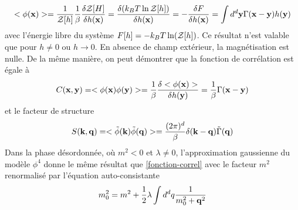 \begin{align}
    <\phi({\bf x})> = \frac{1}{\mathcal{Z}[h]} \frac{1}{\beta} \frac{\delta \mathcal{Z}[H]}{\delta h({\bf x})} = \frac{\delta (k_B T \ln \mathcal{Z}[h])}{\delta h({\bf x})} = - \frac{\delta F}{\delta h({\bf x})} = \int d^d {\bf y} \Gamma({\bf x}-{\bf y}) h({\bf y})
    \label{moyenne-phi}
\end{align} 
avec l'énergie libre du système  $F[h] = -k_B T \ln(\mathcal{Z}[h])$. Ce résultat n'est valable que pour $h \neq 0$ ou $h \to 0$. En absence de champ extérieur, la magnétisation est nulle.
De la même manière, on peut démontrer que la fonction de corrélation est égale à 
\begin{align}
    C({\bf x},{\bf y}) =  <\phi({\bf x})\phi({\bf y})> = \frac{1}{\beta} \frac{\delta <\phi({\bf x})>}{\delta h({\bf y})} = \frac{1}{\beta} \Gamma({\bf x}-{\bf y})
\end{align}
et le facteur de structure
\begin{align}
    S({\bf k},{\bf q}) = < \tilde{\phi}({\bf k})\tilde{\phi}({\bf q})> = \frac{(2 \pi)^d}{\beta} \delta({\bf k}-{\bf q})  \tilde{\Gamma}({\bf q})
\end{align}
Dans la phase désordonnée, où $m^2 \less 0$ et $\lambda \neq 0$, l'approximation gaussienne du modèle $\phi^4$ donne le même résultat que \ref{fonction-correl} avec le facteur $m^2$ renormalisé par l'équation auto-consistante \cite[\P 4.3]{bellac_equilibrium_2004}
\begin{align}
    m^2_0 = m^2 + \frac{1}{2} \lambda \int d^d q \frac{1}{m^2_0+{\bf q}^2}
\end{align}

